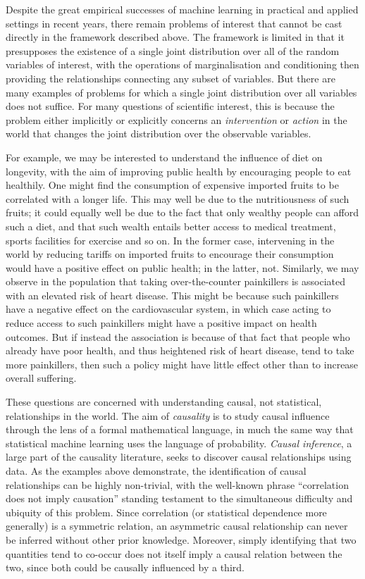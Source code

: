 Despite the great empirical successes of machine learning in practical and applied settings in recent years, there remain problems of interest that cannot be cast directly in the framework described above. 
The framework is limited in that it presupposes the existence of a single joint distribution over all of the random variables of interest, with the operations of marginalisation and conditioning then providing the relationships connecting any subset of variables.
But there are many examples of problems for which a single joint distribution over all variables does not suffice. 
For many questions of scientific interest, this is because the problem either implicitly or explicitly concerns an \emph{intervention} or \emph{action} in the world that changes the joint distribution over the observable variables.

For example, we may be interested to understand the influence of diet on longevity, with the aim of improving public health by encouraging people to eat healthily. 
One might find the consumption of expensive imported fruits to be correlated with a longer life. This may well be due to the nutritiousness of such fruits; it could equally well be due to the fact that only wealthy people can afford such a diet, and that such wealth entails better access to medical treatment, sports facilities for exercise and so on. In the former case, intervening in the world by reducing tariffs on imported fruits to encourage their consumption would have a positive effect on public health; in the latter, not.
Similarly, we may observe in the population that taking over-the-counter painkillers is associated with an elevated risk of heart disease. This might be because such painkillers have a negative effect on the cardiovascular system, in which case acting to reduce access to such painkillers might have a positive impact on health outcomes. But if instead the association is because of that fact that people who already have poor health, and thus heightened risk of heart disease, tend to take more painkillers, then such a policy might have little effect other than to increase overall suffering.

These questions are concerned with understanding causal, not statistical, relationships in the world. 
The aim of \emph{causality} is to study causal influence through the lens of a formal mathematical language, in much the same way that statistical machine learning uses the language of probability. 
\emph{Causal inference}, a large part of the causality literature, seeks to discover causal relationships using data.
As the examples above demonstrate, the identification of causal relationships can be highly non-trivial, with the well-known phrase ``correlation does not imply causation'' standing testament to the simultaneous difficulty and ubiquity of this problem.
Since correlation (or statistical dependence more generally) is a symmetric relation, an asymmetric causal relationship can never be inferred without other prior knowledge. 
Moreover, simply identifying that two quantities tend to co-occur does not itself imply a causal relation between the two, since both could be causally influenced by a third.

